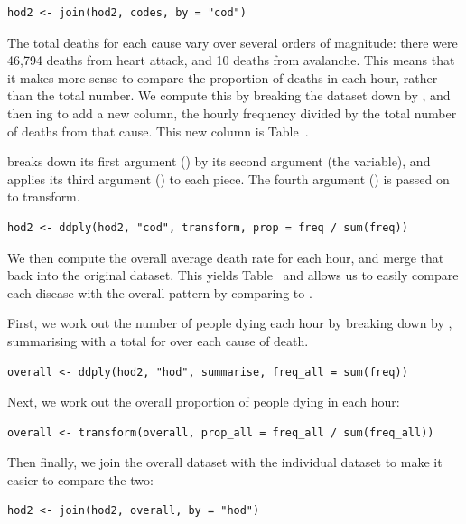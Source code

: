 \documentclass[article]{jss}
\begin{document}
\begin{Verbatim}
hod2 <- join(hod2, codes, by = "cod")
\end{Verbatim}

The total deaths for each cause vary over several orders of magnitude: there were 46,794 deaths from heart attack, and 10 deaths from avalanche. This means that it makes more sense to compare the proportion of deaths in each hour, rather than the total number. We compute this by breaking the dataset down by , and then ing to add a new  column, the hourly frequency divided by the total number of deaths from that cause. This new column is Table~.

 breaks down its first argument () by its second argument (the  variable), and applies its third argument () to each piece. The fourth argument () is passed on to transform.

\begin{Verbatim}
hod2 <- ddply(hod2, "cod", transform, prop = freq / sum(freq))
\end{Verbatim}

We then compute the overall average death rate for each hour, and merge that back into the original dataset. This yields Table~ and allows us to easily compare each disease with the overall pattern by comparing  to .

First, we work out the number of people dying each hour by breaking down  by , summarising with a total for over each cause of death.

\begin{Verbatim}
overall <- ddply(hod2, "hod", summarise, freq_all = sum(freq))
\end{Verbatim}

Next, we work out the overall proportion of people dying in each hour:

\begin{Verbatim}
overall <- transform(overall, prop_all = freq_all / sum(freq_all))
\end{Verbatim}

Then finally, we join the overall dataset with the individual dataset to make it easier to compare the two:

\begin{Verbatim}
hod2 <- join(hod2, overall, by = "hod")
\end{Verbatim}
\end{document}
